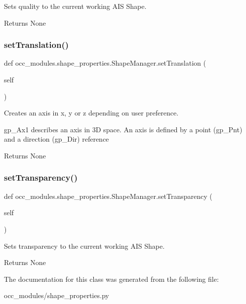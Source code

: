 Sets quality to the current working A\+IS Shape. 

\begin{DoxyReturn}{Returns}
None 
\end{DoxyReturn}
\hypertarget{a00095_a1cab1ea26a1cd0091d88106b6b4715bb}{}\label{a00095_a1cab1ea26a1cd0091d88106b6b4715bb} 
\subsubsection{\texorpdfstring{set\+Translation()}{setTranslation()}}
{\footnotesize\ttfamily def occ\+\_\+modules.\+shape\+\_\+properties.\+Shape\+Manager.\+set\+Translation (\begin{DoxyParamCaption}\item[{}]{self }\end{DoxyParamCaption})}



Creates an axis in x, y or z depending on user preference. 

gp\+\_\+\+Ax1 describes an axis in 3D space. An axis is defined by a point (gp\+\_\+\+Pnt) and a direction (gp\+\_\+\+Dir) reference

\begin{DoxyReturn}{Returns}
None 
\end{DoxyReturn}
\hypertarget{a00095_a8d7fdd0bde28afe34d3793c8bcf060fa}{}\label{a00095_a8d7fdd0bde28afe34d3793c8bcf060fa} 
\subsubsection{\texorpdfstring{set\+Transparency()}{setTransparency()}}
{\footnotesize\ttfamily def occ\+\_\+modules.\+shape\+\_\+properties.\+Shape\+Manager.\+set\+Transparency (\begin{DoxyParamCaption}\item[{}]{self }\end{DoxyParamCaption})}



Sets transparency to the current working A\+IS Shape. 

\begin{DoxyReturn}{Returns}
None 
\end{DoxyReturn}


The documentation for this class was generated from the following file\+:\begin{DoxyCompactItemize}
\item 
occ\+\_\+modules/shape\+\_\+properties.\+py\end{DoxyCompactItemize}
